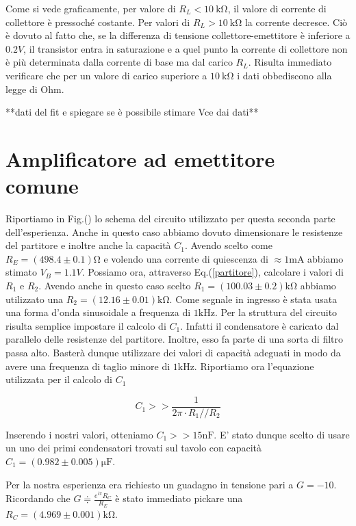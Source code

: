 Come si vede graficamente, per valore di $R_L<\SI{10}{\kilo\ohm}$, il valore di corrente di collettore è pressoché costante. Per valori di $R_L>\SI{10}{\kilo\ohm}$ la corrente decresce. Ciò è dovuto al fatto che, se la differenza di tensione collettore-emettitore è inferiore a $0.2V$, il transistor entra in saturazione e a quel punto la corrente di  collettore non è più determinata dalla corrente di base ma dal carico $R_L$. Risulta immediato verificare che  per un valore di carico superiore a $\SI{10}{\kilo\ohm}$ i dati obbediscono alla legge di Ohm.

**dati del fit e spiegare se è possibile stimare Vce dai dati**   

\section{Amplificatore ad emettitore comune}

Riportiamo in Fig.() lo schema del circuito utilizzato per questa seconda parte dell'esperienza. Anche in questo caso abbiamo dovuto dimensionare le resistenze del partitore e inoltre anche la capacità $C_1$. Avendo scelto come $R_E=(498.4\pm0.1)\si{\ohm}$ e volendo una corrente di quiescenza di $\approx 1\si{\milli\ampere}$ abbiamo stimato $V_B=1.1V$. Possiamo ora, attraverso Eq.(\ref{partitore}), calcolare i valori di $R_1$ e $R_2$. Avendo anche in questo caso scelto $R_1=(100.03\pm0.2)\si{\kilo\ohm}$ abbiamo utilizzato una $R_2=(12.16\pm0.01)\si{\kilo\ohm}$. Come segnale in ingresso è stata usata una forma d'onda sinusoidale a frequenza di $1\si{\kilo\hertz}$. Per la struttura del circuito risulta semplice impostare il calcolo di $C_1$. Infatti il condensatore è caricato dal parallelo delle resistenze del partitore. Inoltre, esso fa parte di una sorta di filtro passa alto. Basterà dunque utilizzare dei valori di capacità adeguati in modo da avere una frequenza di taglio minore di $1\si{\kilo\hertz}$. Riportiamo ora l'equazione utilizzata per il calcolo di $C_1$

\begin{equation}
C_1>>\frac{1}{2 \pi \cdot R_1 // R_2}
\end{equation}

Inserendo i nostri valori, otteniamo $C_1>>15\si{\nano\farad}$. E' stato dunque scelto di usare un uno dei primi condensatori trovati sul tavolo con capacità $C_1=(0.982\pm0.005)\si{\micro\farad}$. 

Per la nostra esperienza era richiesto un guadagno in tensione pari a $G=-10$. Ricordando che $G\doteqdot \frac{e^{i\pi}R_C}{R_E}$ è stato immediato pickare una $R_C=(4.969\pm0.001)\si{\kilo\ohm}$. 

